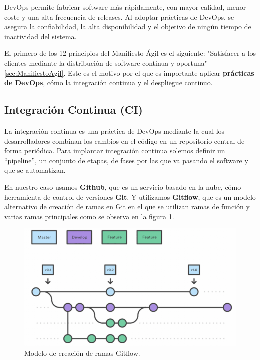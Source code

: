 \documentclass[12pt,twoside,titlepage]{report}
\begin{document}
DevOps permite fabricar software más rápidamente, con mayor calidad, menor coste y una alta frecuencia de releases. Al adoptar prácticas de DevOps, se asegura la confiabilidad, la alta disponibilidad y el objetivo de ningún tiempo de inactividad del sistema.

El primero de los 12 principios del Manifiesto Ágil es el siguiente: "Satisfacer a los clientes mediante la distribución de software continua y oportuna" \ref{sec:ManifiestoAgil}. Este es el motivo por el que es importante aplicar \textbf{prácticas de DevOps}, cómo la integración continua y el despliegue continuo.

\subsection{Integración Continua (CI)}

La integración continua es una práctica de DevOps mediante la cual los desarrolladores combinan los cambios en el código en un repositorio central de forma periódica. Para implantar integración continua solemos definir un ``pipeline'', un conjunto de etapas, de fases por las que va pasando el software y que se automatizan. 

En nuestro caso usamos \textbf{Github}, que es un servicio basado en la nube, cómo herramienta de control de versiones \textbf{Git}. Y utilizamos \textbf{Gitflow}, que es un modelo alternativo de creación de ramas en Git en el que se utilizan ramas de función y varias ramas principales como se observa en la figura \ref{fig:Gitflow}.

\begin{figure}[H]
    \centering
    \includegraphics[scale=0.58]{DevOps/Gitflow}
    \caption{Modelo de creación de ramas Gitflow.}
    \label{fig:Gitflow}
\end{figure}
\end{document}
